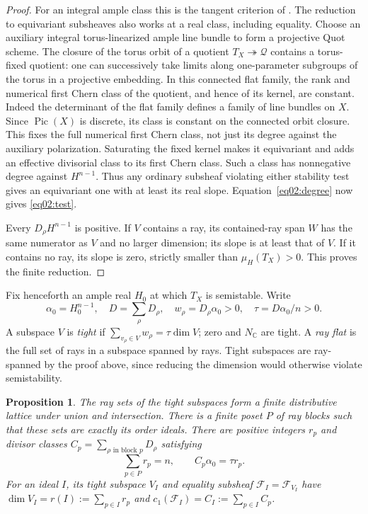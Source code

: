 \documentclass[11pt]{amsart}
\newtheorem{proposition}[theorem]{Proposition}
\theoremstyle{definition}
\theoremstyle{remark}
\newcommand{\CC}{\mathbb C}
\begin{document}
\begin{proof}
For an integral ample class this is the tangent criterion of
\cite[Proposition~1.2 and Remark~2.6]{heringnillsuess2022}.
The reduction to equivariant subsheaves also works at a real class,
including equality. Choose an auxiliary integral torus-linearized
ample line bundle to form a projective Quot scheme. The closure of
the torus orbit of a quotient \(T_X\twoheadrightarrow\mathcal Q\)
contains a torus-fixed quotient: one can successively take limits
along one-parameter subgroups of the torus in a projective embedding.
In this connected flat family, the rank and numerical first Chern
class of the quotient, and hence of its kernel, are constant.
Indeed the determinant of the flat family defines a family of line
bundles on \(X\). Since \(\operatorname{Pic}(X)\) is discrete,
its class is constant on the connected orbit closure. This fixes
the full numerical first Chern class, not just its degree against
the auxiliary polarization.
Saturating the fixed kernel makes it equivariant and adds an
effective divisorial class to its first Chern class. Such a class
has nonnegative degree against \(H^{n-1}\). Thus any ordinary
subsheaf violating either stability test gives an equivariant one
with at least its real slope. Equation~\eqref{eq02:degree} now gives
\eqref{eq02:test}.

Every \(D_\rho H^{n-1}\) is positive. If \(V\) contains a ray,
its contained-ray span \(W\) has the same numerator as \(V\) and
no larger dimension; its slope is at least that of \(V\).
If it contains no ray, its slope is zero, strictly smaller than
\(\mu_H(T_X)>0\). This proves the finite reduction.
\end{proof}

Fix henceforth an ample real \(H_0\) at which \(T_X\) is semistable.
Write
\begin{equation}\label{eq02:weights}
 \alpha_0=H_0^{n-1},\quad D=\sum_\rho D_\rho,
 \quad w_\rho=D_\rho\alpha_0>0,\quad
 \tau=D\alpha_0/n>0.
\end{equation}
A subspace \(V\) is \emph{tight} if
\(\sum_{v_\rho\in V}w_\rho=\tau\dim V\); zero and \(N_\CC\)
are tight. A \emph{ray flat} is the full set of rays in a subspace
spanned by rays. Tight subspaces are ray-spanned by the proof above,
since reducing the dimension would otherwise violate semistability.

\begin{proposition}\label{prop02:lattice}
The ray sets of the tight subspaces form a finite distributive lattice
under union and intersection. There is a finite poset \(P\) of ray
blocks such that these sets are exactly its order ideals. There are
positive integers \(r_p\) and divisor classes
\(C_p=\sum_{\rho\text{ in block }p}D_\rho\) satisfying
\begin{equation}\label{eq02:ranks}
 \sum_{p\in P}r_p=n,\qquad C_p\alpha_0=\tau r_p.
\end{equation}
For an ideal \(I\), its tight subspace \(V_I\) and equality subsheaf
\(\mathcal F_I=\mathcal F_{V_I}\) have
\(\dim V_I=r(I):=\sum_{p\in I}r_p\) and
\(c_1(\mathcal F_I)=C_I:=\sum_{p\in I}C_p\).
\end{proposition}
\end{document}
